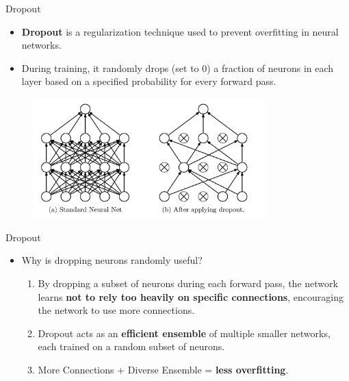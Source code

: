 \documentclass[10pt]{beamer}
\theoremstyle{remark}
\theoremstyle{definition}
\begin{document}
\begin{frame}{Dropout}
    \begin{itemize}
    \item \textbf{Dropout} is a regularization technique used to prevent overfitting in neural networks.
    \item During training, it randomly drops (set to 0) a fraction of neurons in each layer based on a specified probability for every forward pass.
\end{itemize}
    \begin{figure}
    \centering
    \includegraphics[width=0.8\textwidth,height=0.8\textheight,keepaspectratio]{./images/dropout_1.png}
    \end{figure}
\end{frame}

\begin{frame}{Dropout}
\begin{itemize}
    \item Why is dropping neurons randomly useful?
\begin{enumerate}
    \item By dropping a subset of neurons during each forward pass, the network learns \textbf{not to rely too heavily on specific connections}, encouraging the network to use more connections.
 
    \item Dropout acts as an \textbf{efficient ensemble} of multiple smaller networks, each trained on a random subset of neurons.
    \item More Connections + Diverse Ensemble = \textbf{less overfitting}.
\end{enumerate}
\end{itemize}
\end{frame}
\end{document}
